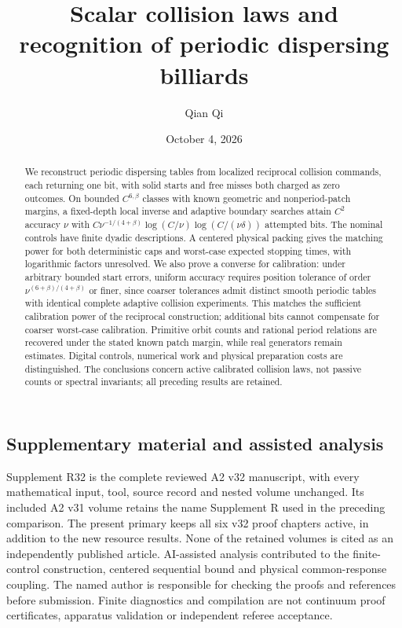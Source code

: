 \documentclass[11pt]{amsart}
\title[Scalar collision laws]{Scalar collision laws and recognition of periodic dispersing billiards}
\author{Qian Qi}
\date{October 4, 2026}
\theoremstyle{definition}\newtheorem{definition}[theorem]{Definition}
\theoremstyle{remark}\newtheorem{remark}[theorem]{Remark}
\numberwithin{equation}{section}
\begin{document}
\begin{abstract}
We reconstruct periodic dispersing tables from localized reciprocal
collision commands, each returning one bit, with solid starts and free
misses both charged as zero outcomes. On bounded $C^{6,\beta}$ classes
with known geometric and nonperiod-patch margins, a fixed-depth local
inverse and adaptive boundary searches attain $C^2$ accuracy $\nu$ with
$C\nu^{-1/(4+\beta)}\log(C/\nu)\log(C/(\nu\delta))$ attempted bits.
The nominal controls have finite dyadic descriptions. A centered physical
packing gives the matching power for both deterministic caps and
worst-case expected stopping times, with logarithmic factors unresolved.
We also prove a converse for calibration: under arbitrary bounded start
errors, uniform accuracy requires position tolerance of order
$\nu^{(6+\beta)/(4+\beta)}$ or finer, since coarser tolerances admit
distinct smooth periodic tables with identical complete adaptive
collision experiments. This matches the sufficient
calibration power of the reciprocal construction; additional bits
cannot compensate for coarser worst-case calibration. Primitive orbit
counts and rational period relations are recovered under the stated
known patch margin, while real generators remain estimates. Digital
controls, numerical work and physical preparation costs are distinguished.
The conclusions concern active calibrated collision laws, not passive
counts or spectral invariants; all preceding results are retained.
\end{abstract}
\maketitle










\subsection*{Supplementary material and assisted analysis}
Supplement R32 is the complete reviewed A2 v32 manuscript, with every
mathematical input, tool, source record and nested volume unchanged.
Its included A2 v31 volume retains the name Supplement R used in the
preceding comparison. The present primary keeps all six v32 proof
chapters active, in addition to the new resource results. None of the
retained volumes is cited as an independently published article.
AI-assisted analysis contributed to the finite-control construction,
centered sequential bound and physical common-response coupling. The
named author is responsible for checking the proofs and references
before submission. Finite diagnostics and compilation are not continuum
proof certificates, apparatus validation or independent referee acceptance.

\end{document}
